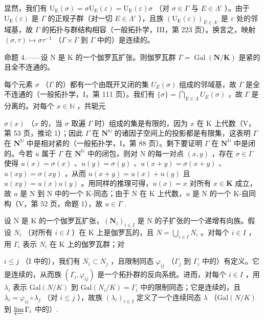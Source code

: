 显然，我们有 \(\mathrm{U}_{\mathrm{E}}(\sigma)=\sigma\mathrm{U}_{\mathrm{E}}(\varepsilon)=\mathrm{U}_{\mathrm{E}}(\varepsilon)\sigma\) （对 \(\sigma\in\Gamma\) 与 \(E\in\Lambda'\) ）。由于 \(\mathrm{U}_{\mathrm{E}}(\varepsilon)\) 是 \(\Gamma\) 的正规子群（对一切 \(E\in\Lambda'\) ），且族 \((\mathrm{U}_{\mathrm{E}}(\varepsilon))_{E\in\Lambda'}\) 是 \(\varepsilon\) 处的邻域基，故 \(\Gamma\) 的拓扑与群结构相容（一般拓扑学，III，第 223 页）。换言之，映射 \((\sigma,\tau)\mapsto\sigma\tau^{-1}\) （\(\Gamma\times\Gamma\) 到 \(\Gamma\) 中的）是连续的。

命题 4.——设 N 是 K 的一个伽罗瓦扩张。则伽罗瓦群 \(\Gamma = \operatorname{Gal}(\mathbf{N}/\mathbf{K})\) 是紧的且全不连通的。

每个元素 \(\sigma\) （\(\Gamma\) 的）都有一个由既开又闭的集 \(U_{E}(\sigma)\) 组成的邻域基，故 \(\Gamma\) 是全不连通的（一般拓扑学，I，第 111 页）。我们有 \(\{\sigma\} = \bigcap_{E \in \Lambda} U_{E}(\sigma)\) ，故 \(\Gamma\) 是分离的。对每个 \(x \in \mathbb{N}\) ，共轭元

\(\sigma(x)\) （\(x\) 的，当 \(\sigma\) 取遍 \(\Gamma\) 时）组成的集是有限的，因为 \(x\) 在 K 上代数（V，第 53 页，推论 1）；因此 \(\Gamma\) 在 \(\mathbf{N}^{\mathbb{N}}\) 的诸因子空间上的投影都是有限集，这表明 \(\Gamma\) 在 \(\mathbf{N}^{\mathbb{N}}\) 中是相对紧的（一般拓扑学，I，第 88 页）。剩下要证明 \(\Gamma\) 在 \(\mathbf{N}^{\mathbb{N}}\) 中是闭的。今若 \(u\) 属于 \(\Gamma\) 在 \(\mathbf{N}^{\mathbb{N}}\) 中的闭包，则对 N 的每一对点 \((x,y)\) ，存在 \(\sigma \in \Gamma\) 使得 \(u(x) = \sigma(x)\) 、\(u(y) = \sigma(y)\) 、\(u(x + y) = \sigma(x + y)\) 、\(u(xy) = \sigma(xy)\) ，从而 \(u(x + y) = u(x) + u(y)\) 且 \(u(xy) = u(x)u(y)\) 。用同样的推理可得，\(u(x) = x\) 对所有 \(x \in \mathbf{K}\) 成立，故 \(u\) 是 N 到 N 中的一个 K-同态；由于 N 在 K 上代数，\(u\) 是 N 的一个 K-自同构（V，第 52 页，命题 1），故 \(u \in \Gamma\) .

设 N 是 K 的一个伽罗瓦扩张，\((\mathbf{N}_{i})_{i\in I}\) 是 N 的子扩张的一个递增有向族。假设 \(N_{i}\) （对所有 \(i\in I\) ）在 K 上是伽罗瓦的，且 \(N=\bigcup_{i\in I}N_{i}\) 。对每个 \(i\in I\) ，用 \(\Gamma_{i}\) 表示 \(N_{i}\) 在 K 上的伽罗瓦群；对

\(i \leqslant j\) （I 中的），我们有 \(N_i \subset N_j\) ，且限制同态 \(\varphi_{ij}\) （\(\Gamma_j\) 到 \(\Gamma_i\) 中的）有定义。它是连续的，从而族 \((\Gamma_i, \varphi_{ij})\) 是一个拓扑群的反向系统。进而，对每个 \(i \in I\) ，用 \(\lambda_i\) 表示 \(\text{Gal}(N/K)\) 到 \(\text{Gal}(N_i/K) = \Gamma_i\) 中的限制同态；它是连续的，且 \(\lambda_i = \varphi_{ij} \circ \lambda_j\) （对 \(i \leqslant j\) ），故族 \((\lambda_i)_{i \in I}\) 定义了一个连续同态 \(\lambda\) （\(\text{Gal}(N/K)\) 到 \(\varprojlim \Gamma_i\) 中的）.

